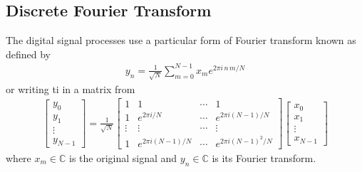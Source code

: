 \documentclass[letterpaper,10pt,english]{jupyterBook}
\begin{document}
\subsection{Discrete Fourier Transform}
\label{\detokenize{algorithms/qft:discrete-fourier-transform}}
\sphinxAtStartPar
The digital signal processes use a particular form  of Fourier transform known as  defined by
\begin{equation}\label{equation:algorithms/qft:DFT}
\begin{split}
y_n = \frac{1}{\sqrt{N}} \sum_{m=0}^{N-1} x_m e^{2\pi i\, n\, m/N}
\end{split}
\end{equation}
\sphinxAtStartPar
or writing ti in a matrix from
\begin{equation}\label{equation:algorithms/qft:DFT-as-matrix}
\begin{split}
\begin{bmatrix}y_0\\y_1\\ \vdots \\ y_{N-1}\end{bmatrix} = \frac{1}{\sqrt{N}}
\begin{bmatrix} 1 & 1 & \cdots & 1 \\ 1 & e^{2\pi i/N} & \cdots & e^{2\pi i (N-1)/N} \\
\vdots & \vdots & \cdots &\vdots \\ 1 & e^{2\pi i (N-1)/N} &\cdots & e^{2\pi i (N-1)^2/N}
\end{bmatrix}
\begin{bmatrix}x_0\\x_1\\ \vdots \\ x_{N-1}\end{bmatrix}
\end{split}
\end{equation}
\sphinxAtStartPar
where \(x_m \in \mathbb{C}\) is the original signal and \(y_n \in \mathbb{C}\) is its Fourier transform.
\end{document}

